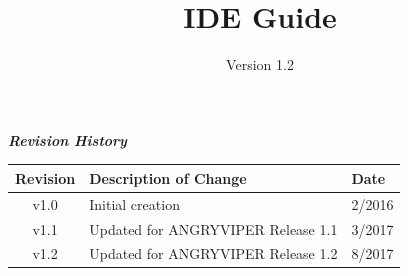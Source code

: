 \def\docTitle{IDE Guide}
\def\docVersion{1.2}

\date{Version \docVersion} %
\title{\docTitle}
\lhead{\small{\docTitle}}

\maketitle
\thispagestyle{fancy}
\newpage

	\begin{center}
	\textit{\textbf{Revision History}}
		\begin{table}[H]
		\label{table:revisions} %
			\begin{tabularx}{\textwidth}{|c|X|l|}
			\hline
			\rowcolor{blue}
			\textbf{Revision} & \textbf{Description of Change} & \textbf{Date} \\
		    \hline
			v1.0 & Initial creation & 2/2016 \\
			\hline
			v1.1 & Updated for ANGRYVIPER Release 1.1 & 3/2017 \\
			\hline
			v1.2 & Updated for ANGRYVIPER Release 1.2 & 8/2017 \\
			\hline
			\end{tabularx}
		\end{table}
	\end{center}

